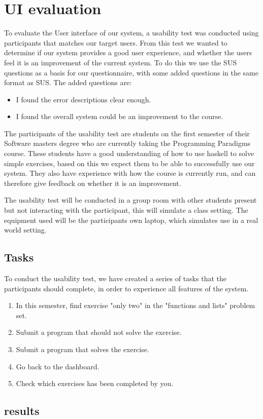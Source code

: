 \section{UI evaluation}
To evaluate the User interface of our system, a usability test was conducted using participants that matches our target users. From this test we wanted to determine if our system provides a good user experience, and whether the users feel it is an improvement of the current system.
To do this we use the SUS questions as a basis for our questionnaire, with some added questions in the same format as SUS. The added questions are:
\begin{itemize}
    \item I found the error descriptions clear enough.
    \item I found the overall system could be an improvement to the course.
\end{itemize}
The participants of the usability test are students on the first semester of their Software masters degree who are currently taking the Programming Paradigms course. 
These students have a good understanding of how to use haskell to solve simple exercises, based on this we expect them to be able to successfully use our system. They also have experience with how the course is currently run, and can therefore give feedback on whether it is an improvement.

The usability test will be conducted in a group room with other students present but not interacting with the participant, this will simulate a class setting. 
The equipment used will be the participants own laptop, which simulates use in a real world setting.

\subsection*{Tasks}
To conduct the usability test, we have created a series of tasks that the participants should complete, in order to experience all features of the system.

\begin{enumerate}
    \item In this semester, find exercise "only two" in the "functions and lists" problem set.
    \item Submit a program that should not solve the exercise.
    \item Submit a program that solves the exercise.
    \item Go back to the dashboard.
    \item Check which exercises has been completed by you.
\end{enumerate}



\subsection*{results}
